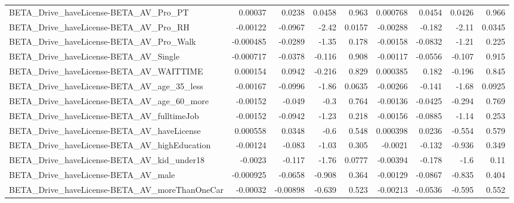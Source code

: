 \begin{tabular}{lrrrrrrrr}
BETA\_Drive\_haveLicense-BETA\_AV\_Pro\_PT              &     0.00037 &       0.0238 &   0.0458 &    0.963 &   0.000768 &      0.0454 &       0.0426 &         0.966 \\
BETA\_Drive\_haveLicense-BETA\_AV\_Pro\_RH              &    -0.00122 &      -0.0967 &    -2.42 &   0.0157 &   -0.00288 &      -0.182 &        -2.11 &        0.0345 \\
BETA\_Drive\_haveLicense-BETA\_AV\_Pro\_Walk            &   -0.000485 &      -0.0289 &    -1.35 &    0.178 &   -0.00158 &     -0.0832 &        -1.21 &         0.225 \\
BETA\_Drive\_haveLicense-BETA\_AV\_Single              &   -0.000717 &      -0.0378 &   -0.116 &    0.908 &   -0.00117 &     -0.0556 &       -0.107 &         0.915 \\
BETA\_Drive\_haveLicense-BETA\_AV\_WAITTIME            &    0.000154 &       0.0942 &   -0.216 &    0.829 &   0.000385 &       0.182 &       -0.196 &         0.845 \\
BETA\_Drive\_haveLicense-BETA\_AV\_age\_35\_less         &    -0.00167 &      -0.0996 &    -1.86 &   0.0635 &   -0.00266 &      -0.141 &        -1.68 &        0.0925 \\
BETA\_Drive\_haveLicense-BETA\_AV\_age\_60\_more         &    -0.00152 &       -0.049 &     -0.3 &    0.764 &   -0.00136 &     -0.0425 &       -0.294 &         0.769 \\
BETA\_Drive\_haveLicense-BETA\_AV\_fulltimeJob         &    -0.00152 &      -0.0942 &    -1.23 &    0.218 &   -0.00156 &     -0.0885 &        -1.14 &         0.253 \\
BETA\_Drive\_haveLicense-BETA\_AV\_haveLicense         &    0.000558 &       0.0348 &     -0.6 &    0.548 &   0.000398 &      0.0236 &       -0.554 &         0.579 \\
BETA\_Drive\_haveLicense-BETA\_AV\_highEducation       &    -0.00124 &       -0.083 &    -1.03 &    0.305 &    -0.0021 &      -0.132 &       -0.936 &         0.349 \\
BETA\_Drive\_haveLicense-BETA\_AV\_kid\_under18         &     -0.0023 &       -0.117 &    -1.76 &   0.0777 &   -0.00394 &      -0.178 &         -1.6 &          0.11 \\
BETA\_Drive\_haveLicense-BETA\_AV\_male                &   -0.000925 &      -0.0658 &   -0.908 &    0.364 &   -0.00129 &     -0.0867 &       -0.835 &         0.404 \\
BETA\_Drive\_haveLicense-BETA\_AV\_moreThanOneCar      &    -0.00032 &     -0.00898 &   -0.639 &    0.523 &   -0.00213 &     -0.0536 &       -0.595 &         0.552 \\

\end{tabular}
